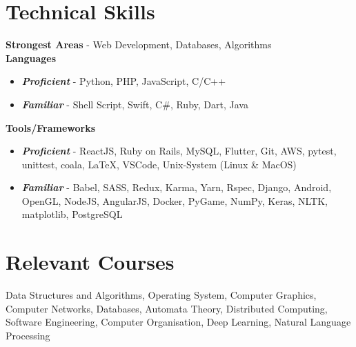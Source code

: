 \documentclass[margin, centered]{res}
\begin{document}
\begin{resume}
        \section{Technical \hspace{2mm} Skills}
            \textbf{Strongest Areas} - Web Development, Databases, Algorithms \\
            \textbf{Languages}
            \begin{itemize}
                \item \textbf{\textsl{Proficient}} - Python, PHP, JavaScript, C/C++
                \item \textbf{\textsl{Familiar}} - Shell Script, Swift, C\#, Ruby, Dart, Java
            \end{itemize}
            \textbf{Tools/Frameworks}
            \begin{itemize}
                \item \textbf{\textsl{Proficient}} - ReactJS, Ruby on Rails, MySQL, Flutter, Git, AWS, pytest, unittest, coala, \LaTeX, VSCode, Unix-System (Linux \& MacOS)
                \item \textbf{\textsl{Familiar}} - Babel, SASS, Redux, Karma, Yarn, Rspec, Django, Android, OpenGL, NodeJS, AngularJS, Docker, PyGame, NumPy, Keras, NLTK, matplotlib, PostgreSQL
            \end{itemize}

        \section{Relevant \hspace{2mm} Courses}
            Data Structures and Algorithms, Operating System, Computer Graphics, Computer Networks,
            Databases, Automata Theory, Distributed Computing, Software Engineering, Computer Organisation, Deep Learning, Natural Language Processing


\end{resume}
\end{document}
